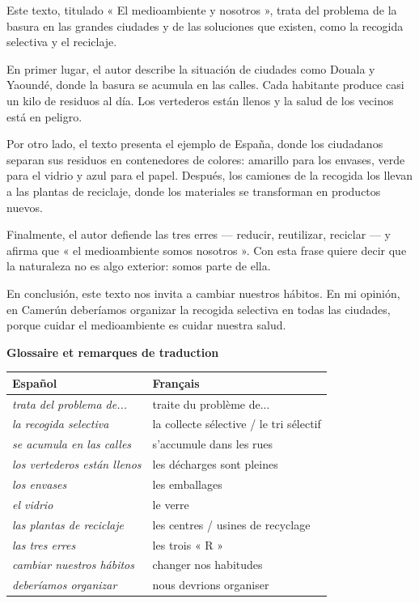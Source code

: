 \documentclass[11pt]{article}
\newcommand{\esp}[1]{\ifmmode\text{\textit{#1}}\else\begingroup\selectlanguage{spanish}\itshape #1\endgroup\fi}
\begin{document}
\begin{textebox}
Este texto, titulado « El medioambiente y nosotros », trata del problema de la basura en las grandes ciudades y de las soluciones que existen, como la recogida selectiva y el reciclaje.

En primer lugar, el autor describe la situación de ciudades como Douala y Yaoundé, donde la basura se acumula en las calles. Cada habitante produce casi un kilo de residuos al día. Los vertederos están llenos y la salud de los vecinos está en peligro.

Por otro lado, el texto presenta el ejemplo de España, donde los ciudadanos separan sus residuos en contenedores de colores: amarillo para los envases, verde para el vidrio y azul para el papel. Después, los camiones de la recogida los llevan a las plantas de reciclaje, donde los materiales se transforman en productos nuevos.

Finalmente, el autor defiende las tres erres — reducir, reutilizar, reciclar — y afirma que « el medioambiente somos nosotros ». Con esta frase quiere decir que la naturaleza no es algo exterior: somos parte de ella.

En conclusión, este texto nos invita a cambiar nuestros hábitos. En mi opinión, en Camerún deberíamos organizar la recogida selectiva en todas las ciudades, porque cuidar el medioambiente es cuidar nuestra salud.
\end{textebox}

\textbf{Glossaire et remarques de traduction}

\begin{center}
\begin{tabularx}{\linewidth}{|X|X|}\hline
\rowcolor{popblueL} \textbf{Español} & \textbf{Français} \\ \hline
\esp{trata del problema de...} & traite du problème de... \\ \hline
\esp{la recogida selectiva} & la collecte sélective / le tri sélectif \\ \hline
\esp{se acumula en las calles} & s'accumule dans les rues \\ \hline
\esp{los vertederos están llenos} & les décharges sont pleines \\ \hline
\esp{los envases} & les emballages \\ \hline
\esp{el vidrio} & le verre \\ \hline
\esp{las plantas de reciclaje} & les centres / usines de recyclage \\ \hline
\esp{las tres erres} & les trois « R » \\ \hline
\esp{cambiar nuestros hábitos} & changer nos habitudes \\ \hline
\esp{deberíamos organizar} & nous devrions organiser \\ \hline
\end{tabularx}
\end{center}
\end{document}
